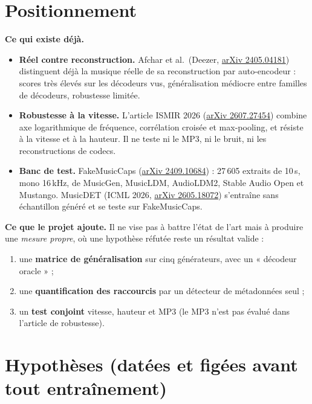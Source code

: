 \documentclass[11pt,a4paper]{article}
\begin{document}
\section{Positionnement}

\textbf{Ce qui existe déjà.}
\begin{itemize}
  \item \textbf{Réel contre reconstruction.} Afchar et al.\ (Deezer, \href{https://arxiv.org/abs/2405.04181}{arXiv 2405.04181}) distinguent déjà la musique réelle de sa reconstruction par auto-encodeur : scores très élevés sur les décodeurs vus, généralisation médiocre entre familles de décodeurs, robustesse limitée.
  \item \textbf{Robustesse à la vitesse.} L'article ISMIR 2026 (\href{https://arxiv.org/abs/2607.27454}{arXiv 2607.27454}) combine axe logarithmique de fréquence, corrélation croisée et max-pooling, et résiste à la vitesse et à la hauteur. Il ne teste ni le MP3, ni le bruit, ni les reconstructions de codecs.
  \item \textbf{Banc de test.} FakeMusicCaps (\href{https://arxiv.org/abs/2409.10684}{arXiv 2409.10684}) : 27\,605 extraits de 10\,s, mono 16\,kHz, de MusicGen, MusicLDM, AudioLDM2, Stable Audio Open et Mustango. MusicDET (ICML 2026, \href{https://arxiv.org/pdf/2605.18072}{arXiv 2605.18072}) s'entraîne sans échantillon généré et se teste sur FakeMusicCaps.
\end{itemize}

\textbf{Ce que le projet ajoute.} Il ne vise pas à battre l'état de l'art mais à produire une \emph{mesure propre}, où une hypothèse réfutée reste un résultat valide :
\begin{enumerate}
  \item une \textbf{matrice de généralisation} sur cinq générateurs, avec un « décodeur oracle » ;
  \item une \textbf{quantification des raccourcis} par un détecteur de métadonnées seul ;
  \item un \textbf{test conjoint} vitesse, hauteur et MP3 (le MP3 n'est pas évalué dans l'article de robustesse).
\end{enumerate}

\newpage

\section{Hypothèses (datées et figées avant tout entraînement)}
\end{document}
